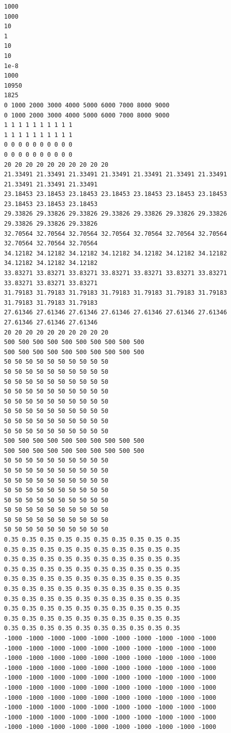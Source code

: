 \begin{lstlisting}[caption= Input file for the Hubleville probelm -- but as an unconfined aquifer -- model is run to equilibrium to establish the pre-development conditions.  Here we choose to use 30 years simulation time as sufficiently long and printed contour maps at 5 year intervals to assess if there is much change as the solution proceeds , label=lst:Hubbleville2]
1000
1000
10
1
10
10
1e-8
1000
10950
1825
0 1000 2000 3000 4000 5000 6000 7000 8000 9000 
0 1000 2000 3000 4000 5000 6000 7000 8000 9000
1 1 1 1 1 1 1 1 1 1 
1 1 1 1 1 1 1 1 1 1
0 0 0 0 0 0 0 0 0 0
0 0 0 0 0 0 0 0 0 0
20 20 20 20 20 20 20 20 20 20
21.33491 21.33491 21.33491 21.33491 21.33491 21.33491 21.33491 21.33491 21.33491 21.33491
23.18453 23.18453 23.18453 23.18453 23.18453 23.18453 23.18453 23.18453 23.18453 23.18453
29.33826 29.33826 29.33826 29.33826 29.33826 29.33826 29.33826 29.33826 29.33826 29.33826
32.70564 32.70564 32.70564 32.70564 32.70564 32.70564 32.70564 32.70564 32.70564 32.70564
34.12182 34.12182 34.12182 34.12182 34.12182 34.12182 34.12182 34.12182 34.12182 34.12182
33.83271 33.83271 33.83271 33.83271 33.83271 33.83271 33.83271 33.83271 33.83271 33.83271
31.79183 31.79183 31.79183 31.79183 31.79183 31.79183 31.79183 31.79183 31.79183 31.79183
27.61346 27.61346 27.61346 27.61346 27.61346 27.61346 27.61346 27.61346 27.61346 27.61346
20 20 20 20 20 20 20 20 20 20
500 500 500 500 500 500 500 500 500 500
500 500 500 500 500 500 500 500 500 500
50 50 50 50 50 50 50 50 50 50
50 50 50 50 50 50 50 50 50 50
50 50 50 50 50 50 50 50 50 50
50 50 50 50 50 50 50 50 50 50
50 50 50 50 50 50 50 50 50 50
50 50 50 50 50 50 50 50 50 50
50 50 50 50 50 50 50 50 50 50
50 50 50 50 50 50 50 50 50 50
500 500 500 500 500 500 500 500 500 500
500 500 500 500 500 500 500 500 500 500
50 50 50 50 50 50 50 50 50 50
50 50 50 50 50 50 50 50 50 50
50 50 50 50 50 50 50 50 50 50
50 50 50 50 50 50 50 50 50 50
50 50 50 50 50 50 50 50 50 50
50 50 50 50 50 50 50 50 50 50
50 50 50 50 50 50 50 50 50 50
50 50 50 50 50 50 50 50 50 50
0.35 0.35 0.35 0.35 0.35 0.35 0.35 0.35 0.35 0.35
0.35 0.35 0.35 0.35 0.35 0.35 0.35 0.35 0.35 0.35
0.35 0.35 0.35 0.35 0.35 0.35 0.35 0.35 0.35 0.35
0.35 0.35 0.35 0.35 0.35 0.35 0.35 0.35 0.35 0.35
0.35 0.35 0.35 0.35 0.35 0.35 0.35 0.35 0.35 0.35
0.35 0.35 0.35 0.35 0.35 0.35 0.35 0.35 0.35 0.35
0.35 0.35 0.35 0.35 0.35 0.35 0.35 0.35 0.35 0.35
0.35 0.35 0.35 0.35 0.35 0.35 0.35 0.35 0.35 0.35
0.35 0.35 0.35 0.35 0.35 0.35 0.35 0.35 0.35 0.35
0.35 0.35 0.35 0.35 0.35 0.35 0.35 0.35 0.35 0.35
-1000 -1000 -1000 -1000 -1000 -1000 -1000 -1000 -1000 -1000
-1000 -1000 -1000 -1000 -1000 -1000 -1000 -1000 -1000 -1000
-1000 -1000 -1000 -1000 -1000 -1000 -1000 -1000 -1000 -1000
-1000 -1000 -1000 -1000 -1000 -1000 -1000 -1000 -1000 -1000
-1000 -1000 -1000 -1000 -1000 -1000 -1000 -1000 -1000 -1000
-1000 -1000 -1000 -1000 -1000 -1000 -1000 -1000 -1000 -1000
-1000 -1000 -1000 -1000 -1000 -1000 -1000 -1000 -1000 -1000
-1000 -1000 -1000 -1000 -1000 -1000 -1000 -1000 -1000 -1000
-1000 -1000 -1000 -1000 -1000 -1000 -1000 -1000 -1000 -1000
-1000 -1000 -1000 -1000 -1000 -1000 -1000 -1000 -1000 -1000
\end{lstlisting}

